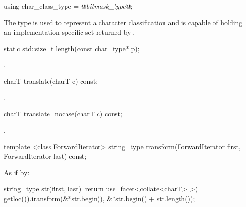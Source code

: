 %
\begin{itemdecl}
using char_class_type = @\textit{bitmask_type}@; 
\end{itemdecl}

\begin{itemdescr}
\pnum
The type  is used to represent a character
classification and is capable of holding an implementation specific
set returned by .
\end{itemdescr}

%
\begin{itemdecl}
static std::size_t length(const char_type* p); 
\end{itemdecl}

\begin{itemdescr}
\pnum\returns {}.
\end{itemdescr}

%
\begin{itemdecl}
charT translate(charT c) const; 
\end{itemdecl}

\begin{itemdescr}
\pnum\returns {}.
\end{itemdescr}

%
\begin{itemdecl}
charT translate_nocase(charT c) const; 
\end{itemdecl}

\begin{itemdescr}
\pnum\returns  {}.
\end{itemdescr}

%
\begin{itemdecl}
template <class ForwardIterator>
  string_type transform(ForwardIterator first, ForwardIterator last) const; 
\end{itemdecl}

\begin{itemdescr}
\pnum\effects
As if by:
\begin{codeblock}
string_type str(first, last);
return use_facet<collate<charT> >(
  getloc()).transform(&*str.begin(), &*str.begin() + str.length());
\end{codeblock}
\end{itemdescr}

